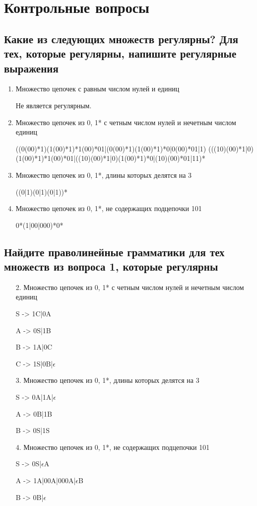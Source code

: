 \chapter{Контрольные вопросы}

\section{Какие из следующих множеств регулярны? Для тех, которые регулярны, напишите регулярные выражения}

\begin{enumerate}
	\item Множество цепочек с равным числом нулей и единиц
	
	Не является регулярным.
	
	\item Множество цепочек из {0, 1}* с четным числом нулей и нечетным числом единиц
	
	((0(00)*1)(1(00)*1)*1(00)*01|(0(00)*1)(1(00)*1)*0|0(00)*01|1)
(((10)(00)*1|0)(1(00)*1)*1(00)*01|((10)(00)*1|0)(1(00)*1)*0|(10)(00)*01|11)*

	\item Множество цепочек из {0, 1}*, длины которых делятся на 3
	
	((0|1)(0|1)(0|1))*
	
	\item Множество цепочек из {0, 1}*, не содержащих подцепочки 101
	
	0*(1|00|000)*0*
\end{enumerate}

\section{Найдите праволинейные грамматики для тех множеств из вопроса 1, которые регулярны}

\begin{enumerate}
	\item[2.] Множество цепочек из {0, 1}* с четным числом нулей и нечетным числом единиц
	
	S -> 1C|0A 
	
	A -> 0S|1B
	
	B -> 1A|0C
	
	C -> 1S|0B|$\epsilon$
	
	\item[3.] Множество цепочек из {0, 1}*, длины которых делятся на 3
	
	S -> 0A|1A|$\epsilon$
	
	A -> 0B|1B
	
	B -> 0S|1S
	
	\item[4.] Множество цепочек из {0, 1}*, не содержащих подцепочки 101
	
	S -> 0S|$\epsilon$A
	
	A -> 1A|00A|000A|$\epsilon$B
	
	B -> 0B|$\epsilon$
	
\end{enumerate}

